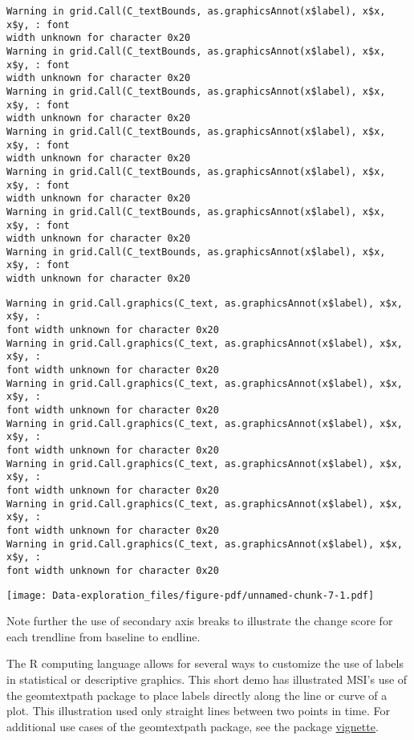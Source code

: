 \documentclass[
  letterpaper,
  DIV=11,
  numbers=noendperiod]{scrreprt}
\begin{document}
\begin{verbatim}
Warning in grid.Call(C_textBounds, as.graphicsAnnot(x$label), x$x, x$y, : font
width unknown for character 0x20
Warning in grid.Call(C_textBounds, as.graphicsAnnot(x$label), x$x, x$y, : font
width unknown for character 0x20
Warning in grid.Call(C_textBounds, as.graphicsAnnot(x$label), x$x, x$y, : font
width unknown for character 0x20
Warning in grid.Call(C_textBounds, as.graphicsAnnot(x$label), x$x, x$y, : font
width unknown for character 0x20
Warning in grid.Call(C_textBounds, as.graphicsAnnot(x$label), x$x, x$y, : font
width unknown for character 0x20
Warning in grid.Call(C_textBounds, as.graphicsAnnot(x$label), x$x, x$y, : font
width unknown for character 0x20
Warning in grid.Call(C_textBounds, as.graphicsAnnot(x$label), x$x, x$y, : font
width unknown for character 0x20
\end{verbatim}

\begin{verbatim}
Warning in grid.Call.graphics(C_text, as.graphicsAnnot(x$label), x$x, x$y, :
font width unknown for character 0x20
Warning in grid.Call.graphics(C_text, as.graphicsAnnot(x$label), x$x, x$y, :
font width unknown for character 0x20
Warning in grid.Call.graphics(C_text, as.graphicsAnnot(x$label), x$x, x$y, :
font width unknown for character 0x20
Warning in grid.Call.graphics(C_text, as.graphicsAnnot(x$label), x$x, x$y, :
font width unknown for character 0x20
Warning in grid.Call.graphics(C_text, as.graphicsAnnot(x$label), x$x, x$y, :
font width unknown for character 0x20
Warning in grid.Call.graphics(C_text, as.graphicsAnnot(x$label), x$x, x$y, :
font width unknown for character 0x20
Warning in grid.Call.graphics(C_text, as.graphicsAnnot(x$label), x$x, x$y, :
font width unknown for character 0x20
\end{verbatim}

\texttt{[image: Data-exploration\_files/figure-pdf/unnamed-chunk-7-1.pdf]}

Note further the use of secondary axis breaks to illustrate the change
score for each trendline from baseline to endline.

The R computing language allows for several ways to customize the use of
labels in statistical or descriptive graphics. This short demo has
illustrated MSI's use of the geomtextpath package to place labels
directly along the line or curve of a plot. This illustration used only
straight lines between two points in time. For additional use cases of
the geomtextpath package, see the package
\href{https://cran.r-project.org/web/packages/geomtextpath/vignettes/geomtextpath.html}{vignette}.
\end{document}
